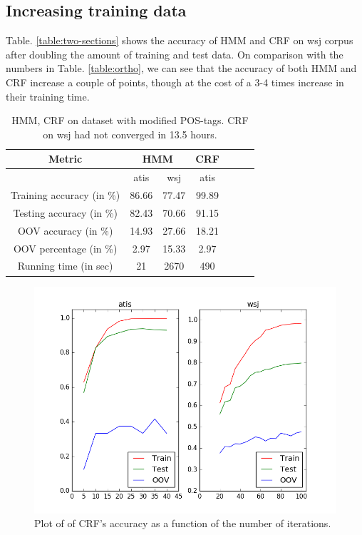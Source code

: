 \documentclass{sig-alternate-05-2015}
\begin{document}
\subsection{Increasing training data}
Table. \ref{table:two-sections} shows the accuracy of HMM and CRF on wsj corpus after doubling the amount of training and test data. On comparison with the numbers in Table. \ref{table:ortho}, we can see that the accuracy of both HMM and CRF increase a couple of points, though at the cost of a 3-4 times increase in their training time.

\begin{table}[ht]
\centering
  \begin{tabular}{|c|c|c|c|c|c|c|}
  	\hline
  	{\bf Metric} & \multicolumn{2}{|c|}{{\bf HMM}} & \multicolumn{1}{|c|}{{\bf CRF}} \\
	\hline 
  	& atis & wsj & atis\\
  	\hline
 	Training accuracy (in \%) & 86.66 & 77.47 & 99.89\\
	Testing accuracy (in \%) & 82.43 & 70.66 & 91.15\\
	OOV accuracy (in \%) & 14.93 & 27.66 & 18.21\\
    OOV percentage (in \%) & 2.97 & 15.33 & 2.97\\
    Running time (in sec) & 21 & 2670 & 490 \\
  \hline
  \end{tabular}
\caption{HMM, CRF on dataset with modified POS-tags. CRF on wsj had not converged in 13.5 hours.}
\label{table:modified}
\end{table}

\begin{figure}
\centering
\includegraphics[width=0.95\columnwidth]{figs/iterations}
\caption{Plot of of CRF's accuracy as a function of the number of iterations.}
\label{fig:iterations}
\end{figure}
\end{document}
